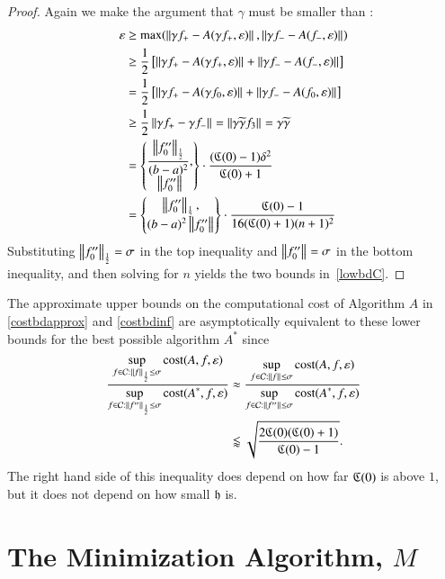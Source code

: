 \documentclass[review]{elsarticle}
\newcommand{\abstol}{\varepsilon}
\theoremstyle{definition}
\newcommand{\tgamma}{\widetilde{\gamma}}
\begin{document}
\begin{proof}
Again we make the argument that $\gamma$ must be smaller than :
\begin{align*}
\abstol & \ge \max(\norm{\gamma f_+-A(\gamma f_+,\abstol)},\norm{\gamma f_--A(f_-, \abstol)}) \\
& \ge \frac{1}{2} \left[ \norm{\gamma f_+-A(\gamma f_+,\abstol)}+ \norm{\gamma f_--A(f_-, \abstol)} \right] \\
& = \frac{1}{2} \left[ \norm{\gamma f_+-A(\gamma f_0,\abstol)}+ \norm{\gamma f_--A(f_0, \abstol)} \right] \\
& \ge \frac{1}{2}  \norm{\gamma f_+ - \gamma f_-} =  \norm{\gamma \tgamma f_3} = \gamma \tgamma\\
& = \begin{Bmatrix} \displaystyle
\frac{\norm[\frac 12]{f_0''}}{(b-a)^2}, \\
\norm{f_0''}
\end{Bmatrix}  \cdot \frac{(\fC(0)-1)\delta^2}{\fC(0)+1} \\
& = \begin{Bmatrix} \displaystyle
\norm[\frac 12]{f_0''}, \\
(b-a)^2\norm{f_0''}
\end{Bmatrix}  \cdot \frac{\fC(0)-1}{16(\fC(0)+1)(n+1)^2}
\end{align*}
Substituting $\norm[\frac12]{f_0''} = \sigma$ in the top inequality and $\norm{f_0''} = \sigma$ in the bottom inequality, and then solving for $n$ yields the two bounds in~\eqref{lowbdC}.
\end{proof}

The approximate upper bounds on the computational cost of Algorithm $A$ in  \eqref{costbdapprox} and \eqref{costbdinf} are asymptotically equivalent to these lower bounds for the best possible algorithm $A^*$ since
\begin{align*}
\frac{\displaystyle \sup_{f \in \cc : \norm[\frac 12]{f} \le \sigma} \cost(A,f,\abstol)}{\displaystyle	\sup_{f \in \cc : \norm[\frac12]{f''} \le\sigma } \cost(A^*,f,\abstol) } & \approx
\frac{\displaystyle \sup_{f \in \cc : \norm{f} \le \sigma} \cost(A,f,\abstol)}{\displaystyle	\sup_{f \in \cc : \norm{f''} \le\sigma } \cost(A^*,f,\abstol) } \\ & \lessapprox \sqrt{\frac{2 \fC(0)(\fC(0)+1)}{\fC(0)-1}}.
\end{align*}
The right hand side of this inequality does depend on how far $\fC(0)$ is above $1$, but it does not depend on how small $\fh$ is.

\section{The Minimization Algorithm, $M$} \label{sec:funmin}
\end{document}
